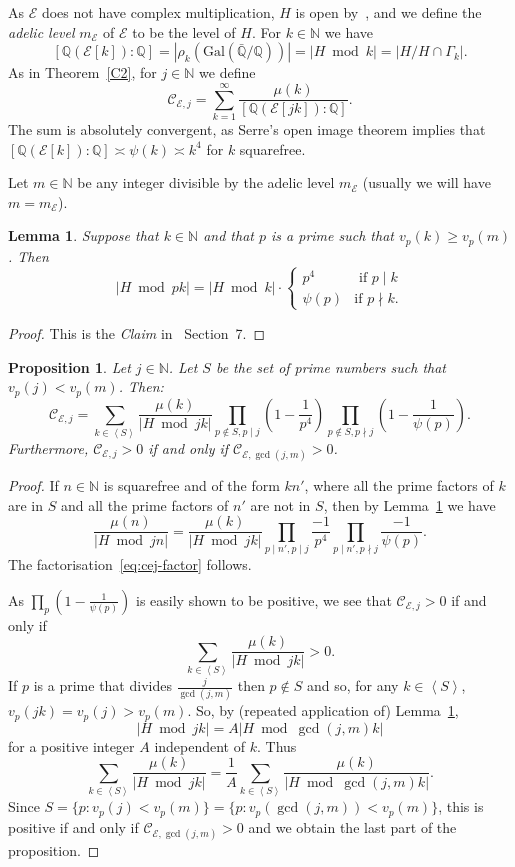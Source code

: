 \documentclass{amsart}
\theoremstyle{plain}
\newtheorem{lemma}[theorem]{Lemma}
\newtheorem{prop}[theorem]{Proposition}
\theoremstyle{remark}
\newcommand{\N}{\mathbb{N}}
\newcommand{\Q}{\mathbb{Q}}
\newcommand{\E}{\mathcal{E}}
\newcommand{\Cc}{\mathcal{C}}
\newcommand{\GalQ}{\mathrm{Gal}(\bar{\Q}/\Q)}
\newcommand{\pres}[1]{\left\langle#1\right\rangle}
\begin{document}
As $\E$ does not have complex multiplication, $H$ is open by~\cite[Théorème 3]{Ser}, and we define the \emph{adelic level} $m_{\E}$ of $\E$ to be the level of $H$. 
For $k \in \N$ we have
\[[\Q(\E[k]):\Q] = |\rho_k(\GalQ)| = |H \bmod k| = |H/H\cap \Gamma_k|.\]
As in Theorem~\ref{C2}, for $j \in \N$ we define
\[\Cc_{\E, j} = \sum_{k=1}^\infty \frac{\mu(k)}{[\Q(\E[jk]):\Q]}.\]
The sum is absolutely convergent, as Serre's open image theorem implies that $[\Q(\E[k]):\Q]  \asymp \psi(k) \asymp k^4$ for $k$ squarefree.

Let $m\in \N$ be any integer divisible by the adelic level $m_\E$ (usually we will have $m = m_\E$).

\begin{lemma}\label{lem:FK} Suppose that $k \in \N$ and that $p$ is a prime such that $v_p(k) \ge v_p(m)$. Then 
\[|H\bmod pk| = |H\bmod k| \cdot \begin{cases} p^4 &\text{ if $p \mid k$} \\ \psi(p) & \text{if $p\nmid k$}.\end{cases}\]
\end{lemma}
\begin{proof}
    This is the \emph{Claim} in~\cite{FK14} Section~7.
\end{proof}

\begin{prop}\label{prop:cej-factor}
Let $j \in \N$. Let $S$ be the set of prime numbers such that $v_p(j) < v_p(m)$. Then:
\begin{equation}\label{eq:cej-factor}\Cc_{\E,j} = \sum_{k \in \pres{S}} \frac{\mu(k)}{|H\bmod jk|} \prod_{p\not\in S, p \mid j}\left(1 - \frac{1}{p^4}\right)\prod_{p \not\in S, p \nmid j}\left(1 - \frac{1}{\psi(p)}\right) .\end{equation}
Furthermore, $\Cc_{\E, j} > 0$ if and only if $\Cc_{\E, \gcd(j,m)} > 0$.
\end{prop}
\begin{proof}
    If $n \in \N$ is squarefree and of the form $kn'$, where all the prime factors of $k$ are in $S$ and all the prime factors of $n'$ are not in $S$, then by Lemma~\ref{lem:FK} we have
    \[\frac{\mu(n)}{|H\bmod jn|} = \frac{\mu(k)}{|H \bmod jk|}\prod_{p\mid n', p\mid j} \frac{-1}{p^4}\prod_{p \mid n', p \nmid j}\frac{-1}{\psi(p)}.\]
    The factorisation~\eqref{eq:cej-factor} follows.

    As $\prod_{p}\left(1 - \frac{1}{\psi(p)}\right)$ is easily shown to be positive, we see that $\Cc_{\E,j} > 0$ if and only if \[\sum_{k \in \pres{S}} \frac{\mu(k)}{|H\bmod jk|} > 0.\]
    If $p$ is a prime that divides $\frac{j}{\gcd(j,m)}$ then $p \not \in S$ and so, for any $k \in \pres{S}$, $v_p(jk) = v_p(j) > v_p(m)$. So, by (repeated application of) Lemma~\ref{lem:FK}, \[|H \bmod jk| = A|H \bmod \gcd(j,m)k|\] for a positive integer $A$ independent of $k$. Thus 
    \[\sum_{k \in \pres{S}} \frac{\mu(k)}{|H\bmod jk|} = \frac{1}{A}\sum_{k \in \pres{S}} \frac{\mu(k)}{|H\bmod \gcd(j,m)k|}.\]
    Since $S = \{p : v_p(j) < v_p(m)\} = \{p : v_p(\gcd(j,m)) < v_p(m)\}$, this is positive if and only if $\Cc_{\E, \gcd(j,m)} > 0$ and we obtain the last part of the proposition.    
\end{proof}
\end{document}
